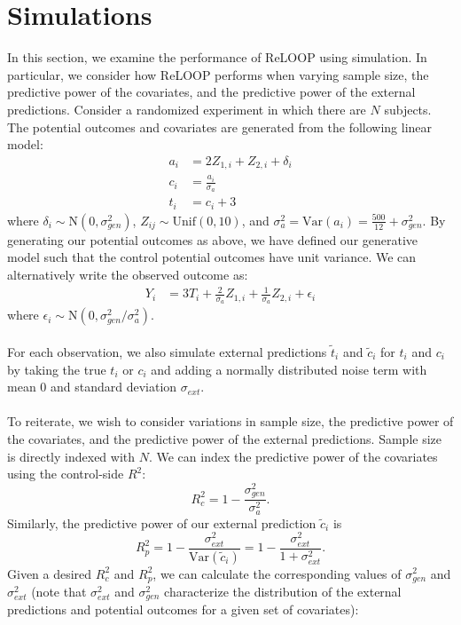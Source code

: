 
\section{Simulations}
In this section, we examine the performance of ReLOOP using simulation. In particular, we consider how ReLOOP performs when varying sample size, the predictive power of the covariates, and the predictive power of the external predictions. Consider a randomized experiment in which there are $N$ subjects. The potential outcomes and covariates are generated from the following linear model:
\begin{align*}
a_i &= 2Z_{1,i} + Z_{2,i} + \delta_i \\
c_i &= \frac{ a_i }{ \sigma_{a} } \\
t_i &= c_i + 3
\end{align*}
where $\delta_i \sim \text{N}(0,\sigma_{gen}^2)$, $Z_{ij} \sim \text{Unif}(0,10)$, and $\sigma^2_{a} = \text{Var}(a_i) = \frac{500}{12} + \sigma_{gen}^2$. By generating our potential outcomes as above, we have defined our generative model such that the control potential outcomes have unit variance. We can alternatively write the observed outcome as:
\begin{align*}
Y_i &= 3 T_i + \frac{2}{\sigma_{a}}Z_{1,i} + \frac{1}{\sigma_{a}} Z_{2,i} + \epsilon_i
\end{align*}
where $\epsilon_i \sim \text{N}(0,\sigma_{gen}^2/\sigma^2_{a})$.
\\\\
For each observation, we also simulate external predictions $\tilde{t}_i$ and $\tilde{c}_i$ for $t_i$ and $c_i$ by taking the true $t_i$ or $c_i$ and adding a normally distributed noise term with mean 0 and standard deviation $\sigma_{ext}$.
\\\\
To reiterate, we wish to consider variations in sample size, the predictive power of the covariates, and the predictive power of the external predictions. Sample size is directly indexed with $N$. We can index the predictive power of the covariates using the control-side $R^2$:
\[ R_c^2 = 1 - \frac{ \sigma^2_{gen} }{ \sigma^2_{a} }. \]
Similarly, the predictive power of our external prediction $\tilde{c}_i$ is
\[ R^2_{p} = 1 - \frac{\sigma_{ext}^2}{\text{Var}( \tilde{c}_i )} = 1 - \frac{\sigma^2_{ext}}{1+\sigma^2_{ext}}. \]
Given a desired $R_c^2$ and $R^2_{p}$, we can calculate the corresponding values of $\sigma^2_{gen}$ and $\sigma^2_{ext}$ (note that $\sigma_{ext}^2$ and $\sigma_{gen}^2$ characterize the distribution of the external predictions and potential outcomes for a given set of covariates):
